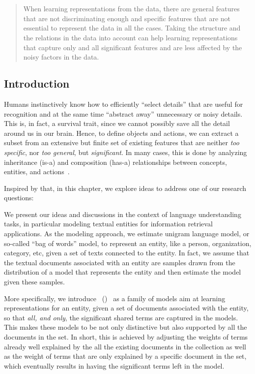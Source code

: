 \chapter{}
\label{chap:2}
%
\begin{quote}
When learning representations from the data, there are general features that are not discriminating enough and specific features that are not essential to represent the data in all the cases. Taking the structure and the relations in the data into account can help learning representations that capture only and all significant features and are less affected by the noisy factors in the data.
\end{quote}
%
\section{Introduction}
Humans instinctively know how to efficiently ``select details'' that are useful for recognition and at the same time ``abstract away'' unnecessary or noisy details.~\cite{tenenbaum2011grow, gentner1997structure, battaglia2018relational} 
This is, in fact, a survival trait, since we cannot possibly save all the detail around us in our brain. Hence, to define objects and actions, we can extract a subset from an extensive but finite set of existing features that are neither \emph{too specific}, nor \emph{too general}, but \emph{significant}. In many cases, this is done by analyzing inheritance (is-a) and composition (has-a) relationships between concepts, entities, and actions~\citep{goodwin2005reasoning, botvinick2008hierarchical}. 

Inspired by that, in this chapter, we explore ideas to address one of our research questions:

We present our ideas and discussions in the context of language understanding tasks, in particular modeling textual entities for information retrieval applications. As the modeling approach, we estimate unigram language model, or so-called  ``bag of words'' model, to represent an entity, like a person, organization, category, etc, given a set of texts connected to the entity.  In fact, we assume that the textual documents associated with an entity are samples drawn from the distribution of a model that represents the entity and then estimate the model given these samples.

More specifically, we introduce \textsl{\swlms}\ (\acswlm)~\cite{Dehghani:CIKM2016:long, Dehghani:2016:CHIIR, Dehghani2016:trec} as a family of models aim at learning representations for an entity, given a set of documents associated with the entity, so that \emph{all, and only}, the significant shared terms are captured in the models. This makes these models to be not only distinctive but also supported by all the documents in the set. In short, this is achieved by adjusting the weights of terms already well explained by the all the existing documents in the collection as well as the weight of terms that are only explained by a specific document in the set, which eventually results in having the significant terms left in the model. 


